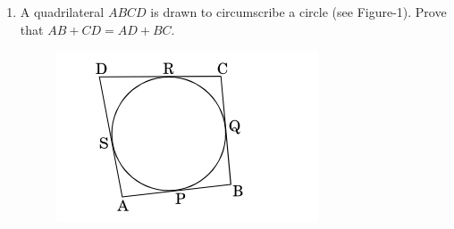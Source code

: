 \begin{enumerate}
	\item A quadrilateral $ABCD$ is drawn to circumscribe a circle (see Figure-1). Prove that $AB + CD = AD + BC$.
	\begin{figure}[!htb]
		\centering
			\includegraphics[width=\columnwidth]{figs/circ-1.png}
		

\end{figure}
\end{enumerate}
